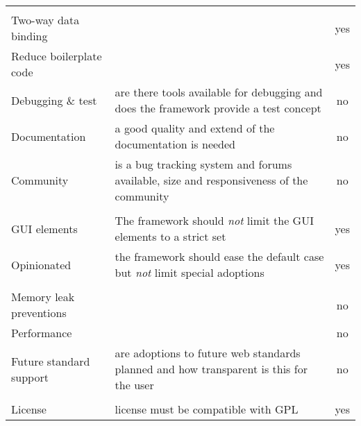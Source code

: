 \begin{minipage}{\linewidth}
	\centering
	\label{tab:req_mvc_frameworks}
	\begin{tabulary}{\textwidth}{|L|L|C|}
		\hline 
		 &  &  \tabularnewline		
		\hline
		\\
 		\hline
		Two-way data binding&  & yes\tabularnewline
		\hline
		Reduce boilerplate code & & yes \tabularnewline
		\hline
	 	Debugging \& test & are there tools available for debugging and does the framework provide a test concept & no\tabularnewline
	  	\hline
	 	Documentation & a good quality and extend of the documentation is needed & no\tabularnewline
	  	\hline
	 	Community & is a bug tracking system and forums available, size and responsiveness of the community & no\tabularnewline
		\hline
	 	\tabularnewline
 		\hline
    		GUI elements & The framework should \emph{not} limit the GUI elements to a strict set & yes\tabularnewline
    		\hline
		Opinionated & the framework should ease the default case but \emph{not} limit special adoptions & yes\tabularnewline
		\hline
	 	\tabularnewline
 		\hline
		Memory leak preventions & & no \tabularnewline
	 	\hline
		Performance &  & no\tabularnewline
	 	\hline
		Future standard support& are adoptions to future web standards planned and how transparent is this for the user & no\tabularnewline
		\hline
	 	\tabularnewline
 		\hline
		License & license must be compatible with GPL & yes\tabularnewline
 		\hline
 	\end{tabulary}
\end{minipage}

